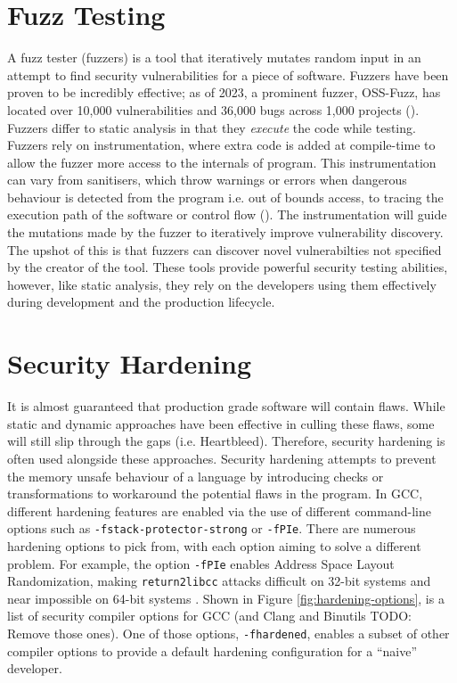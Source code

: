 \section{Fuzz Testing}

A fuzz tester (fuzzers) is a tool that iteratively mutates random input in an attempt to find security vulnerabilities for a piece of software. 
Fuzzers have been proven to be incredibly effective; as of 2023, a prominent fuzzer, OSS-Fuzz, has located over 10,000 vulnerabilities and 36,000 bugs across 1,000 projects (\cite{google2023ossfuzz}).
Fuzzers differ to static analysis in that they \emph{execute} the code while testing. 
Fuzzers rely on instrumentation, where extra code is added at compile-time to allow the fuzzer more access to the internals of program. 
This instrumentation can vary from sanitisers, which throw warnings or errors when dangerous behaviour is detected from the program i.e. out of bounds access, to tracing the execution path of the software or control flow (\cite{llvm2024sanitizer}).
The instrumentation will guide the mutations made by the fuzzer to iteratively improve vulnerability discovery. 
The upshot of this is that fuzzers can discover novel vulnerabilties not specified by the creator of the tool. 
These tools provide powerful security testing abilities, however, like static analysis, they rely on the developers using them effectively during development and the production lifecycle. 

\section{Security Hardening}
It is almost guaranteed that production grade software will contain flaws. 
While static and dynamic approaches have been effective in culling these flaws, some will still slip through the gaps (i.e. Heartbleed).
Therefore, security hardening is often used alongside these approaches. 
Security hardening attempts to prevent the memory unsafe behaviour of a language by introducing checks or transformations to workaround the potential flaws in the program. 
In GCC, different hardening features are enabled via the use of different command-line options such as \texttt{-fstack-protector-strong} or \texttt{-fPIe}. 
There are numerous hardening options to pick from, with each option aiming to solve a different problem.
For example, the option \texttt{-fPIe} enables Address Space Layout Randomization, making \texttt{return2libcc} attacks difficult on 32-bit systems and near impossible on 64-bit systems \cite{??}. 
Shown in Figure \ref{fig:hardening-options}, is a list of security compiler options for GCC (and Clang and Binutils TODO: Remove those ones). 
One of those options, \texttt{-fhardened}, enables a subset of other compiler options to provide a default hardening configuration for a ``naive'' developer. 


